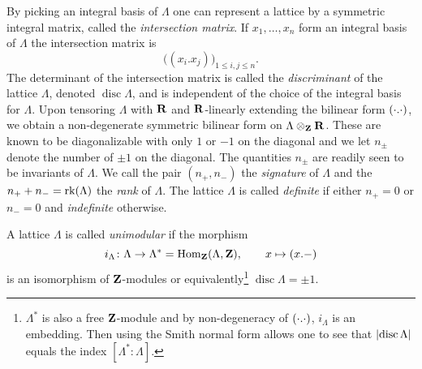 By picking an integral basis of $\Lambda$ one can represent a lattice by a symmetric integral matrix, called the \emph{intersection matrix}. If $x_1, \dots, x_n$ form an integral basis of $\Lambda$ the intersection matrix is
\[
    \bigl( (x_i.x_j)\bigr)_{1 \leq i, j \leq n}.
\]
The determinant of the intersection matrix is called the \emph{discriminant} of the lattice $\Lambda$, denoted $\operatorname{disc}\Lambda$, and is independent of the choice of the integral basis for $\Lambda$. Upon tensoring $\Lambda$ with $\mathbf R$ and $\mathbf R$-linearly extending the bilinear form $(\cdot.\cdot)$, we obtain a non-degenerate symmetric bilinear form on $\Lambda \otimes_\mathbf Z \mathbf R$. These are known to be diagonalizable with only $1$ or $-1$ on the diagonal and we let $n_\pm$ denote the number of $\pm 1$ on the diagonal. The quantities $n_\pm$ are readily seen to be invariants of $\Lambda$. We call the pair $(n_+, n_-)$ the \emph{signature} of $\Lambda$ and the $n_+ + n_- = \operatorname{rk}(\Lambda)$ the \emph{rank} of $\Lambda$. The lattice $\Lambda$ is called \emph{definite} if either $n_+ = 0$ or $n_- = 0$ and \emph{indefinite} otherwise.





\begin{definition}
    A lattice $\Lambda$ is called \emph{unimodular} if the morphism
    \[
        i_\Lambda \colon \Lambda \to \Lambda^* = \mathrm{Hom}_\mathbf Z(\Lambda, \mathbf Z), \qquad x \mapsto (x.-)
    \]
    is an isomorphism of $\mathbf Z$-modules or equivalently\footnote{
        $\Lambda^*$ is also a free $\mathbf Z$-module and by non-degeneracy of $(\cdot.\cdot)$, $i_\Lambda$ is an embedding. Then \eg using the Smith normal form allows one to see that $\left\lvert \operatorname{disc}\Lambda \right\rvert$ equals the index $[\Lambda^* : \Lambda]$.
    } $\operatorname{disc}\Lambda = \pm 1$.
\end{definition}

